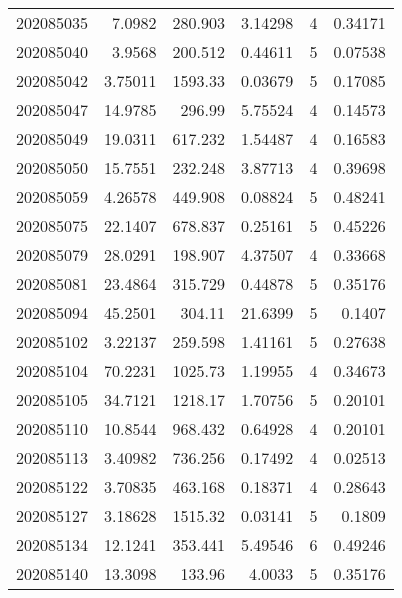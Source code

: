 \begin{tabular}{rrrrrr}
 202085035 &          7.0982  &      280.903  &            3.14298 &           4 & 0.34171 \\
 202085040 &          3.9568  &      200.512  &            0.44611 &           5 & 0.07538 \\
 202085042 &          3.75011 &     1593.33   &            0.03679 &           5 & 0.17085 \\
 202085047 &         14.9785  &      296.99   &            5.75524 &           4 & 0.14573 \\
 202085049 &         19.0311  &      617.232  &            1.54487 &           4 & 0.16583 \\
 202085050 &         15.7551  &      232.248  &            3.87713 &           4 & 0.39698 \\
 202085059 &          4.26578 &      449.908  &            0.08824 &           5 & 0.48241 \\
 202085075 &         22.1407  &      678.837  &            0.25161 &           5 & 0.45226 \\
 202085079 &         28.0291  &      198.907  &            4.37507 &           4 & 0.33668 \\
 202085081 &         23.4864  &      315.729  &            0.44878 &           5 & 0.35176 \\
 202085094 &         45.2501  &      304.11   &           21.6399  &           5 & 0.1407  \\
 202085102 &          3.22137 &      259.598  &            1.41161 &           5 & 0.27638 \\
 202085104 &         70.2231  &     1025.73   &            1.19955 &           4 & 0.34673 \\
 202085105 &         34.7121  &     1218.17   &            1.70756 &           5 & 0.20101 \\
 202085110 &         10.8544  &      968.432  &            0.64928 &           4 & 0.20101 \\
 202085113 &          3.40982 &      736.256  &            0.17492 &           4 & 0.02513 \\
 202085122 &          3.70835 &      463.168  &            0.18371 &           4 & 0.28643 \\
 202085127 &          3.18628 &     1515.32   &            0.03141 &           5 & 0.1809  \\
 202085134 &         12.1241  &      353.441  &            5.49546 &           6 & 0.49246 \\
 202085140 &         13.3098  &      133.96   &            4.0033  &           5 & 0.35176 \\

\end{tabular}

